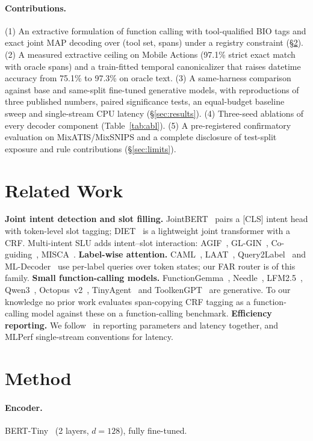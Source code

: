 \documentclass[11pt]{article}
\begin{document}
\paragraph{Contributions.}
(1) An extractive formulation of function calling with tool-qualified BIO tags and exact joint MAP
decoding over (tool set, spans) under a registry constraint (\S\ref{sec:method}).
(2) A measured extractive ceiling on Mobile Actions (97.1\% strict exact match with oracle spans) and a
train-fitted temporal canonicalizer that raises datetime accuracy from 75.1\% to 97.3\% on oracle text.
(3) A same-harness comparison against base and same-split fine-tuned generative models, with
reproductions of three published numbers, paired significance tests, an equal-budget baseline sweep and
single-stream CPU latency (\S\ref{sec:results}).
(4) Three-seed ablations of every decoder component (Table~\ref{tab:abl}). (5) A pre-registered confirmatory evaluation on MixATIS/MixSNIPS and a complete disclosure of
test-split exposure and rule contributions (\S\ref{sec:limits}).

\section{Related Work}
\textbf{Joint intent detection and slot filling.} JointBERT~\cite{jointbert} pairs a [CLS] intent head
with token-level slot tagging; DIET~\cite{diet} is a lightweight joint transformer with a CRF.
Multi-intent SLU adds intent--slot interaction: AGIF~\cite{agif}, GL-GIN~\cite{glgin},
Co-guiding~\cite{coguiding}, MISCA~\cite{misca}.
\textbf{Label-wise attention.} CAML~\cite{caml}, LAAT~\cite{laat}, Query2Label~\cite{query2label} and
ML-Decoder~\cite{mldecoder} use per-label queries over token states; our FAR router is of this family.
\textbf{Small function-calling models.} FunctionGemma~\cite{functiongemma}, Needle~\cite{needle},
LFM2.5~\cite{lfm25}, Qwen3~\cite{qwen3}, Octopus~v2~\cite{octopus}, TinyAgent~\cite{tinyagent} and
ToolkenGPT~\cite{toolkengpt} are generative. To our knowledge no prior work evaluates span-copying
CRF tagging as a function-calling model against these on a function-calling benchmark.
\textbf{Efficiency reporting.} We follow~\cite{effmisnomer} in reporting parameters and latency
together, and MLPerf single-stream conventions for latency.

\section{Method}\label{sec:method}
\paragraph{Encoder.} BERT-Tiny~\cite{berttiny} (2 layers, $d{=}128$), fully fine-tuned.
\end{document}
